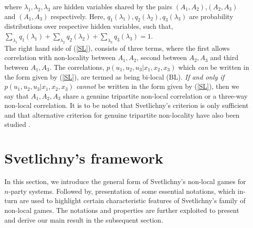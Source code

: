 \documentclass[%
 reprint,
 amsmath,amssymb,
 aps,
]{revtex4-1}
\theoremstyle{plain}
\begin{document}
where $\lambda_1,{\lambda_2},{\lambda_3}$ are hidden variables shared by the pairs $(A_1,A_2)$,$(A_2,A_3)$ and $(A_1,A_3)$ respectively. Here, $q_1(\lambda_1),q_2({\lambda_2}),q_3({\lambda_3})$ are probability distributions over respective hidden variables, such that, $\sum_{\lambda_1} q_1(\lambda_1)+\sum_{\lambda_2} q_2({\lambda_2})+\sum_{\lambda_3} q_3({\lambda_3})=1$. \\
The right hand side of (\ref{SL}), consists of three terms, where the first allows correlation with non-locality between $A_1,A_2$, second between $A_2,A_3$ and third between $A_1,A_3$. The correlations,  $p(u_1,u_2,u_3|x_1,x_2,x_3)$ which \textit{can} be written in the form given by (\ref{SL}), are termed as being bi-local (BL). \textit{If and only if} $p(u_1,u_2,u_3|x_1,x_2,x_3)$ \textit{cannot} be written in the form given by (\ref{SL}), then we say that $A_1,A_2,A_3$ share a genuine tripartite non-local correlation or a three-way non-local correlation. It is to be noted that Svetlichny's criterion is only sufficient and that alternative criterion for genuine tripartite non-locality have also been studied \cite{bancal2011definition,gallego2012operational}. \\
\section{Svetlichny's framework}
In this section, we introduce the general form of Svetlichny's non-local games for $n$-party systems. Followed by, presentation of some essential notations, which in-turn are used to highlight certain characteristic features of Svetlichny's family of non-local games. The notations and properties are further exploited to present and derive our main result in the subsequent section.  
\end{document}
